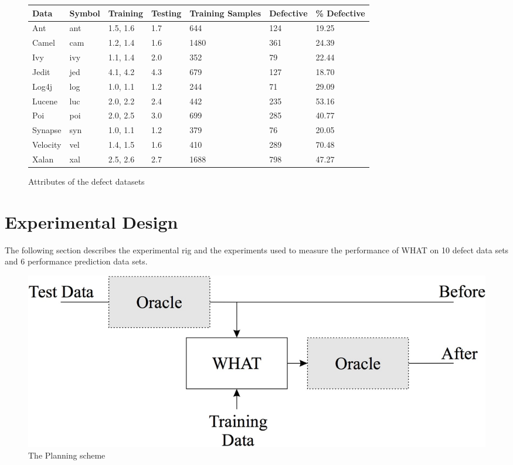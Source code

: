 \documentclass[conference]{IEEEtran}
\begin{document}
\begin{figure}[!tb]
  \renewcommand{\baselinestretch}{0.8}\begin{center}
{\scriptsize
\begin{tabular}{l@{~~~}l@{~~~}l@{~~~}l@{~~~}l@{~~~}l@{~~~}l@{~~}}
  \hline
  \rowcolor{lightgray}
  Data & Symbol & Training & Testing & Training Samples& Defective &\% Defective \\\hline

Ant & ant & 1.5, 1.6  &1.7 & 644&124&19.25\\

Camel & cam & 1.2, 1.4 & 1.6 & 1480&361 & 24.39\\

Ivy & ivy & 1.1, 1.4 & 2.0  & 352 & 79 & 22.44\\

Jedit & jed & 4.1, 4.2 & 4.3 & 679 & 127 & 18.70\\

Log4j & log & 1.0, 1.1 & 1.2 & 244 & 71 & 29.09\\

Lucene & luc & 2.0, 2.2 & 2.4 & 442 & 235 & 53.16\\

Poi & poi & 2.0, 2.5 & 3.0 & 699 & 285 & 40.77\\

Synapse & syn & 1.0, 1.1 & 1.2 & 379 & 76 & 20.05\\

Velocity & vel & 1.4, 1.5 & 1.6 & 410& 289 & 70.48\\

Xalan & xal &2.5, 2.6 &2.7 & 1688 & 798 & 47.27\\\hline
\end{tabular}}
\end{center}
\caption{Attributes of the defect datasets}\label{fig:ck}
\end{figure}

\section{Experimental Design}
The following section describes the experimental rig and the experiments used to measure the performance of WHAT on 10 defect data sets and 6 performance prediction data sets.

\begin{figure}[tbp!]
  \includegraphics[width=\linewidth]{./_figs/WHAT}
  \caption{The Planning scheme}
  \label{fig:what}
\end{figure}
\end{document}
